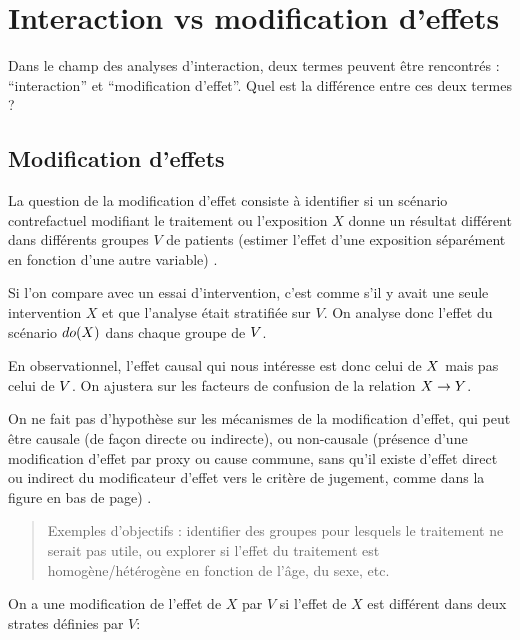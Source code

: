 \documentclass[
]{book}
\begin{document}
\hypertarget{intmodif}{%
\chapter{Interaction vs modification d'effets}\label{intmodif}}

Dans le champ des analyses d'interaction, deux termes peuvent être rencontrés : ``interaction'' et ``modification d'effet''. Quel est la différence entre ces deux termes ?

\hypertarget{modification-deffets}{%
\section{Modification d'effets}\label{modification-deffets}}

La question de la modification d'effet consiste à identifier si un scénario contrefactuel modifiant le traitement ou l'exposition \(X\) donne un résultat différent dans différents groupes \(V\) de patients (estimer l'effet d'une exposition séparément en fonction d'une autre variable) \citet{corraini_effect_2017}.

Si l'on compare avec un essai d'intervention, c'est comme s'il y avait une seule intervention \(X\) et que l'analyse était stratifiée sur \(V\). On analyse donc l'effet du scénario \(\small do(X)\) dans chaque groupe de \(\small V\).

En observationnel, l'effet causal qui nous intéresse est donc celui de \(\small X\) mais pas celui de \(\small V\).
On ajustera sur les facteurs de confusion de la relation \(\small X \rightarrow Y\).

On ne fait pas d'hypothèse sur les mécanismes de la modification d'effet, qui peut être causale (de façon directe ou indirecte), ou non-causale (présence d'une modification d'effet par proxy ou cause commune, sans qu'il existe d'effet direct ou indirect du modificateur d'effet vers le critère de jugement, comme dans la figure en bas de page) \citet{vanderweele_four_2007}.

\begin{quote}
Exemples d'objectifs : identifier des groupes pour lesquels le traitement ne serait pas utile, ou explorer si l'effet du traitement est homogène/hétérogène en fonction de l'âge, du sexe, etc.
\end{quote}

On a une modification de l'effet de \(X\) par \(V\) si l'effet de \(X\) est différent dans deux strates définies par \(V\):
\end{document}

